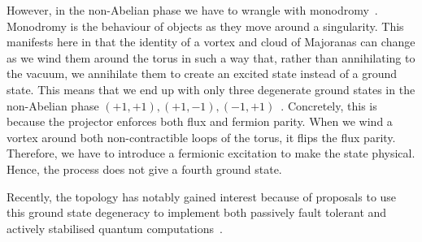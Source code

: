 However, in the non-Abelian phase we have to wrangle with monodromy~\autocite{chungExplicitMonodromyMoore2007,oshikawaTopologicalDegeneracyNonAbelian2007}. Monodromy is the behaviour of objects as they move around a singularity. This manifests here in that the identity of a vortex and cloud of Majoranas can change as we wind them around the torus in such a way that, rather than annihilating to the vacuum, we annihilate them to create an excited state instead of a ground state. This means that we end up with only three degenerate ground states in the non-Abelian phase \((+1, +1), (+1, -1), (-1, +1)\)~\autocite{chungTopologicalQuantumPhase2010,yaoAlgebraicSpinLiquid2009}. Concretely, this is because the projector enforces both flux and fermion parity. When we wind a vortex around both non-contractible loops of the torus, it flips the flux parity. Therefore, we have to introduce a fermionic excitation to make the state physical. Hence, the process does not give a fourth ground state.

Recently, the topology has notably gained interest because of proposals to use this ground state degeneracy to implement both passively fault tolerant and actively stabilised quantum computations~\autocite{kitaevFaulttolerantQuantumComputation2003,poulinStabilizerFormalismOperator2005,hastingsDynamicallyGeneratedLogical2021}.
